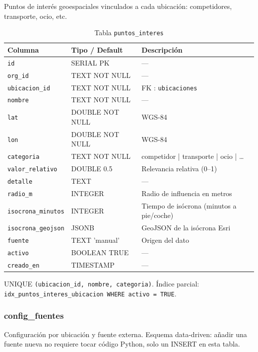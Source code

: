 \documentclass[12pt, a4paper]{article}
\begin{document}
Puntos de interés geoespaciales vinculados a cada ubicación: competidores, transporte, ocio, etc.

\begin{table}[H]
\centering
\renewcommand{\arraystretch}{1.2}
\begin{tabular}{llp{5.5cm}}
\toprule
\textbf{Columna} & \textbf{Tipo / Default} & \textbf{Descripción} \\
\midrule
\texttt{id}               & SERIAL PK      & — \\
\texttt{org\_id}          & TEXT NOT NULL  & — \\
\texttt{ubicacion\_id}    & TEXT NOT NULL  & FK : \texttt{ubicaciones} \\
\texttt{nombre}           & TEXT NOT NULL  & — \\
\texttt{lat}              & DOUBLE NOT NULL & WGS-84 \\
\texttt{lon}              & DOUBLE NOT NULL & WGS-84 \\
\texttt{categoria}        & TEXT NOT NULL  & competidor | transporte | ocio | \ldots \\
\texttt{valor\_relativo}  & DOUBLE 0.5     & Relevancia relativa (0–1) \\
\texttt{detalle}          & TEXT           & — \\
\texttt{radio\_m}         & INTEGER        & Radio de influencia en metros \\
\texttt{isocrona\_minutos} & INTEGER       & Tiempo de isócrona (minutos a pie/coche) \\
\texttt{isocrona\_geojson} & JSONB         & GeoJSON de la isócrona Esri \\
\texttt{fuente}           & TEXT 'manual'  & Origen del dato \\
\texttt{activo}           & BOOLEAN TRUE   & — \\
\texttt{creado\_en}       & TIMESTAMP      & — \\
\bottomrule
\end{tabular}
\caption{Tabla \texttt{puntos\_interes}}
\end{table}

UNIQUE \texttt{(ubicacion\_id, nombre, categoria)}. Índice parcial: \texttt{idx\_puntos\_interes\_ubicacion WHERE activo = TRUE}.

\subsubsection{config\_fuentes}

Configuración por ubicación y fuente externa. Esquema data-driven: añadir una fuente nueva no requiere tocar código Python, solo un INSERT en esta tabla.
\end{document}
